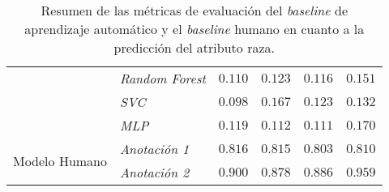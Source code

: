 \begin{table}[htpb]
{\begin{tabular}{llcccc}
        \cmidrule{2-6}
                                            & \emph{Random Forest}        & $0.110$ & $0.123$ & $0.116$ & $0.151$\\
        \cmidrule{2-6}
                                            & \emph{SVC}                  & $0.098$ & $0.167$ & $0.123$ & $0.132$\\
        \cmidrule{2-6}
                                            & \emph{MLP}                  & $0.119$ & $0.112$ & $0.111$ & $0.170$\\
        \midrule\midrule
        \multirow{2}{*}{Modelo Humano}      & \emph{Anotaci\'on 1}        & $0.816$ & $0.815$ & $0.803$ & $0.810$\\
        \cmidrule{2-6}
                                            & \emph{Anotaci\'on 2}        & $0.900$ & $0.878$ & $0.886$ & $0.959$\\
        \bottomrule
        \end{tabular}}
    \caption{Resumen de las m\'etricas de evaluaci\'on del \emph{baseline} de aprendizaje autom\'atico y el \emph{baseline} humano 
    en cuanto a la predicci\'on del atributo raza.}
    \label{table:eval_baselines_race}
\end{table}

